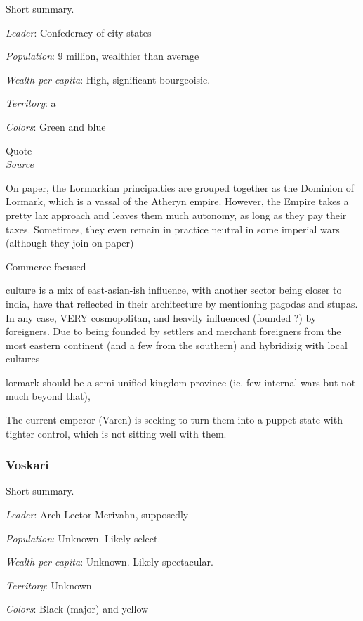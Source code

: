 Short summary.

\textit{Leader}: Confederacy of city-states

\textit{Population}: 9 million, wealthier than average

\textit{Wealth per capita}: High, significant bourgeoisie.

\textit{Territory}: a
    
\textit{Colors}: Green and blue


\begin{rpg-quotebox}
Quote \\ \textendash \textit{Source}
\end{rpg-quotebox}

On paper, the Lormarkian principalties are grouped together as the Dominion of Lormark, which is a vassal of the Atheryn empire. However, the Empire takes a pretty lax approach and leaves them much autonomy, as long as they pay their taxes. Sometimes, they even remain in practice neutral in some imperial wars (although they join on paper)

Commerce focused

culture is a mix of east-asian-ish influence, with another sector being closer to india, have that reflected in their architecture by mentioning pagodas and stupas. In any case, VERY cosmopolitan, and heavily influenced (founded ?) by foreigners. Due to being founded by settlers and merchant foreigners from the most eastern continent (and a few from the southern) and hybridizig with local cultures

lormark should be a semi-unified kingdom-province (ie. few internal wars but not much beyond that), 

The current emperor (Varen) is seeking to turn them into a puppet state with tighter control, which is not sitting well with them.

	

\subsubsection{Voskari}

Short summary.


\textit{Leader}: Arch Lector Merivahn, supposedly

\textit{Population}: Unknown. Likely select.

\textit{Wealth per capita}: Unknown. Likely spectacular.

\textit{Territory}: Unknown
    
\textit{Colors}: Black (major) and yellow







